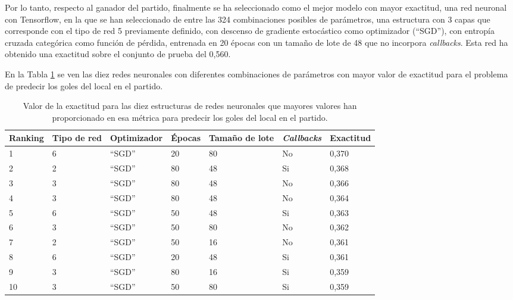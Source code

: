 Por lo tanto, respecto al ganador del partido, finalmente se ha seleccionado como el mejor modelo con mayor
exactitud, una red neuronal con Tensorflow, en la que se han seleccionado de entre las 324
combinaciones posibles de parámetros, una estructura con 3 capas que corresponde con el tipo de red 5 previamente definido, con descenso de gradiente
estocástico como optimizador (``SGD''), con entropía cruzada categórica como función de pérdida,
entrenada en 20 épocas con un tamaño de lote de 48 que no incorpora \textit{callbacks}. Esta red ha
obtenido una exactitud sobre el conjunto de prueba del 0,560.



En la Tabla \ref{table:exactitud-redes-local} se ven las diez redes neuronales con diferentes combinaciones de parámetros con mayor valor de exactitud para el problema de predecir los goles del local en el partido.

\begin{table}[]
    \centering
    \begin{tabular}{|l|l|l|l|l|l|l|}
        \hline
        \rowcolor[HTML]{C0C0C0}
        Ranking & Tipo de red & Optimizador & Épocas & Tamaño de lote & \textit{Callbacks} & Exactitud \\ \hline
        1                & 6           & ``SGD''         & 20     & 80         & No        & 0,370     \\ \hline
        2                & 2           & ``SGD''        & 80     & 48         & Si        & 0,368     \\ \hline
        3                & 3           & ``SGD''        & 80     & 48         & No        & 0,366     \\ \hline
        4                & 3           & ``SGD''        & 80     & 48         & No        & 0,364     \\ \hline
        5                & 6           & ``SGD''         & 50     & 48         & Si        & 0,363     \\ \hline
        6                & 3           & ``SGD''        & 50     & 80         & No        & 0,362     \\ \hline
        7                & 2           & ``SGD''        & 50     & 16         & No        & 0,361     \\ \hline
        8                & 6           & ``SGD''        & 20     & 48         & Si        & 0,361     \\ \hline
        9                & 3           & ``SGD''         & 80     & 16         & Si        & 0,359     \\ \hline
        10               & 3           & ``SGD''        & 50     & 80         & Si        & 0,359     \\ \hline
    \end{tabular}
    \caption{Valor de la exactitud para las diez estructuras de redes neuronales que mayores valores han proporcionado en esa métrica para predecir los goles del local en el partido.}
    \label{table:exactitud-redes-local}
\end{table}


